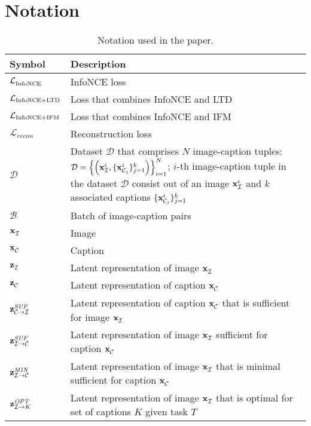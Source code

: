 
\clearpage
\section{Notation}
\label{appendix:notation}

\begin{table}[htb!]
\centering
	\setlength{\tabcolsep}{1pt}
	\setlength\extrarowheight{-1.25pt}
\caption{Notation used in the paper.}
\label{tab:notation}
\begin{tabular}{p{} p{}} 
\toprule
\textbf{Symbol} & \textbf{Description} \\ \midrule
$\infonce{}$ & InfoNCE loss \\ \cmidrule{2-2}
$\ltd{}$ & Loss that combines InfoNCE and \acf{LTD} \\ \cmidrule{2-2}
$\ifm{}$ & Loss that combines InfoNCE and \acf{IFM} \\ \cmidrule{2-2}
$\mathcal{L}_{recon}$  & Reconstruction loss \\ \cmidrule{2-2}
$\mathcal{D}$ & Dataset $\mathcal{D}$ that comprises $N$ image-caption tuples: $\mathcal{D} = \left\{\left(\img{i}, \{\capt{i}{j}\}_{j=1}^{k} \right) \right\}_{i=1}^{N}$; $i$-th image-caption tuple in the dataset $\mathcal{D}$ consist out of an image $\img{i}$ and $k$ associated captions $\{\capt{i}{j}\}_{j=1}^{k}$ 
\\ \cmidrule{2-2}
$\mathcal{B}$ & Batch of image-caption pairs \\ \cmidrule{2-2}
$\img{}$ & Image \\ \cmidrule{2-2}
$\capt{}{}$ & Caption \\ \cmidrule{2-2}
$\zimg{}{}$ & Latent representation of image $\img{}$ \\ \cmidrule{2-2}
$\zcapt{}{}$ & Latent representation of caption $\capt{}{}$ \\ \cmidrule{2-2}
$\zcaptsuff{}{}$ & Latent representation of caption $\capt{}{}$ that is sufficient for image $\img{}$ \\ \cmidrule{2-2}
$\zimgsuff{}$ & Latent representation of image $\img{}$ sufficient for caption $\capt{}{}$ 
\\ \cmidrule{2-2}
$\zminsuff{}$ & Latent representation of image $\img{}$ that is minimal sufficient for caption $\capt{}{}$ 
\\ \cmidrule{2-2}
$\zoptimal{}{K}$ & Latent representation of image $\img{}$ that is optimal for set of captions $K$ given  task $T$  \\ \cmidrule{2-2}

\end{tabular}
\end{table}

